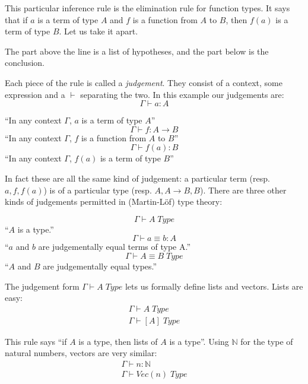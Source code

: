 This particular inference rule is the elimination rule for function types. It
says that if $a$ is a term of type $A$ and $f$ is a function from $A$ to $B$,
then $f(a)$ is a term of type $B$. Let us take it apart.

The part above the line is a list of hypotheses, and the part below is the conclusion.

Each piece of the rule is called a \emph{judgement}. They consist of a
context, some expression and a $\vdash$ separating the two. In this example our judgements are:
\[\Gamma \vdash a : A\]
\begin{center}
``In any context $\Gamma$, $a$ is a term of type $A$''
\[\Gamma \vdash f : A \rightarrow B\]
``In any context $\Gamma$, $f$ is a function from $A$ to $B$''
\[\Gamma \vdash f(a) : B\]
``In any context $\Gamma$, $f(a)$ is a term of type $B$''
\end{center}

In fact these are all the same kind of judgement: a particular term (resp. $a, f,
f(a)$) is of a particular type (resp. $A, A \rightarrow B, B$). There are three
other kinds of judgements permitted in (Martin-Löf) type theory:
\begin{center}
  \[\Gamma \vdash A \; Type\]
  ``$A$ is a type.''
  \[\Gamma \vdash a \equiv b : A\]
  ``$a$ and $b$ are judgementally equal terms of type A.''
  \[\Gamma \vdash A \equiv B \; Type\]
  ``$A$ and $B$ are judgementally equal types.''
\end{center}

The judgement form $\Gamma \vdash A \; Type$ lets us formally define lists and
vectors. Lists are easy:
\begin{equation*}
  \begin{array}{c}
    \Gamma \vdash A \; Type \\
    \hline
    \Gamma \vdash [A] \; Type
  \end{array}
  \label{rule:lists}
\end{equation*}

This rule says ``if $A$ is a type, then lists of $A$ is a type''. Using
$\mathbb{N}$ for the type of natural numbers, vectors are very similar:
\begin{equation*}
  \begin{array}{c}
    \Gamma \vdash n : \mathbb{N} \\
    \hline
    \Gamma \vdash Vec (n) \; Type
  \end{array}
  \label{rule:lists}
\end{equation*}

